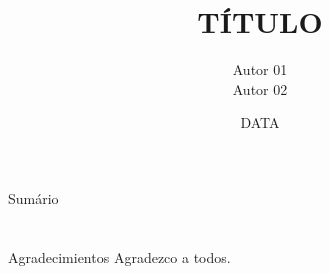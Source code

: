 \documentclass[handout,t]{beamer}
\title[SUBTÍTULO]{
	TÍTULO}
\date{
	DATA}
\author[AUTOR]{
	Autor 01 \inst{1}\\
	\vspace{0.25cm}
	Autor 02 \inst{2}}
\institute[INSTITUTO]{
	\inst{1}%
	\url{usuario@mail.com}\\
	\vspace{0.25cm}
	\inst{2}%
	Departamento\\
	Universidade}
\begin{document}
\frame{\titlepage}
\section[]{}
\begin{frame}{Sumário}
	\tableofcontents
\end{frame}











\section{}
\begin{frame}{Agradecimientos}
	Agradezco a todos.
\end{frame}
\end{document}
